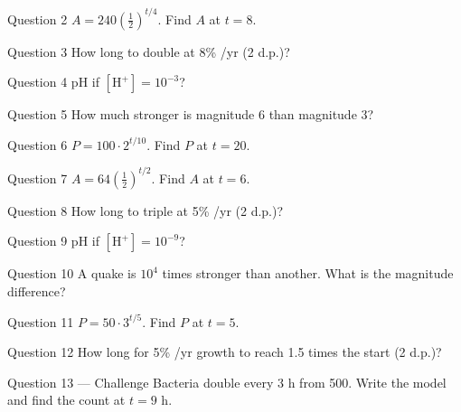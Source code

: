 \documentclass[11pt]{article}
\begin{document}
\begin{qbox}{Question 2}
$A=240(\tfrac12)^{t/4}$. Find $A$ at $t=8$.\workspace{2.4cm}
\end{qbox}

\begin{qbox}{Question 3}
How long to double at 8\% /yr (2 d.p.)?\workspace{2.4cm}
\end{qbox}

\begin{qbox}{Question 4}
pH if $[\text{H}^+]=10^{-3}$?\workspace{2.4cm}
\end{qbox}

\begin{qbox}{Question 5}
How much stronger is magnitude 6 than magnitude 3?\workspace{2.4cm}
\end{qbox}

\begin{qbox}{Question 6}
$P=100\cdot2^{t/10}$. Find $P$ at $t=20$.\workspace{2.4cm}
\end{qbox}

\begin{qbox}{Question 7}
$A=64(\tfrac12)^{t/2}$. Find $A$ at $t=6$.\workspace{2.4cm}
\end{qbox}

\begin{qbox}{Question 8}
How long to triple at 5\% /yr (2 d.p.)?\workspace{2.4cm}
\end{qbox}

\begin{qbox}{Question 9}
pH if $[\text{H}^+]=10^{-9}$?\workspace{2.4cm}
\end{qbox}

\begin{qbox}{Question 10}
A quake is $10^4$ times stronger than another. What is the magnitude difference?\workspace{2.4cm}
\end{qbox}

\begin{qbox}{Question 11}
$P=50\cdot3^{t/5}$. Find $P$ at $t=5$.\workspace{2.4cm}
\end{qbox}

\begin{qbox}{Question 12}
How long for 5\% /yr growth to reach 1.5 times the start (2 d.p.)?\workspace{2.4cm}
\end{qbox}

\begin{qbox}{Question 13 --- Challenge}
Bacteria double every 3 h from 500. Write the model and find the count at $t=9$ h.\workspace{3.5cm}
\end{qbox}
\end{document}
